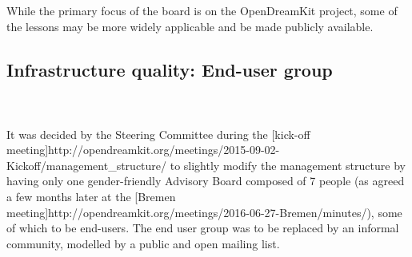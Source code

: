 \documentclass{deliverablereport}
\begin{document}
 While the primary focus of the board is on the OpenDreamKit project,
 some of the lessons may be more widely applicable and be made
 publicly available.








\subsection{Infrastructure quality: End-user group}
~\\~\\

It was decided by the Steering Committee during the [kick-off meeting]{http://opendreamkit.org/meetings/2015-09-02-Kickoff/management_structure/} to slightly modify
the management structure by having only one gender-friendly Advisory Board composed of 7 people (as agreed a few months later at the [Bremen meeting]{http://opendreamkit.org/meetings/2016-06-27-Bremen/minutes/}),
some of which to be end-users.
The end user group was to be replaced by an informal community, modelled by a public and open mailing list.
\end{document}
